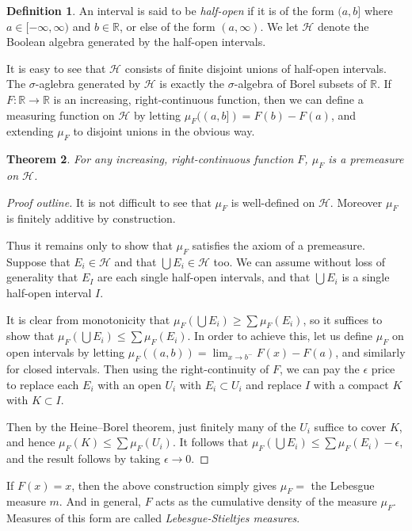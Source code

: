 \documentclass[11pt,oneside]{amsbook}
\newcommand{\RR}{{\mathbb R}}
\theoremstyle{definition}
\theoremstyle{plain}
\newtheorem{thm}{Theorem}[section]
\theoremstyle{definition}
\newtheorem{defn}[thm]{Definition}
\theoremstyle{remark}
\numberwithin{equation}{section}
\numberwithin{figure}{section}
\begin{document}
\begin{defn}
  An interval is said to be \emph{half-open} if it is of the form $(a,b]$ where $a\in[-\infty,\infty)$ and $b\in\RR$, or else of the form $(a,\infty)$. We let $\mathcal H$ denote the Boolean algebra generated by the half-open intervals.
\end{defn}

It is easy to see that $\mathcal H$ consists of finite disjoint unions of half-open intervals. The $\sigma$-aglebra generated by $\mathcal H$ is exactly the $\sigma$-algebra of Borel subsets of $\RR$. If $F\colon\RR\to\RR$ is an increasing, right-continuous function, then we can define a measuring function on $\mathcal H$ by letting $\mu_F((a,b])=F(b)-F(a)$, and extending $\mu_F$ to disjoint unions in the obvious way.

\begin{thm}
  For any increasing, right-continuous function $F$, $\mu_F$ is a premeasure on $\mathcal H$.
\end{thm}

\begin{proof}[Proof outline]
  It is not difficult to see that $\mu_F$ is well-defined on $\mathcal H$. Moreover $\mu_F$ is finitely additive by construction.

  Thus it remains only to show that $\mu_F$ satisfies the axiom of a premeasure. Suppose that $E_i\in\mathcal H$ and that $\bigcup E_i\in\mathcal H$ too. We can assume without loss of generality that $E_I$ are each single half-open intervals, and that $\bigcup E_i$ is a single half-open interval $I$.

  It is clear from monotonicity that $\mu_F(\bigcup E_i)\geq\sum\mu_F(E_i)$, so it suffices to show that $\mu_F(\bigcup E_i)\leq\sum\mu_F(E_i)$. In order to achieve this, let us define $\mu_F$ on open intervals by letting $\mu_F((a,b))=\lim_{x\to b^-}F(x)-F(a)$, and similarly for closed intervals. Then using the right-continuity of $F$, we can pay the $\epsilon$ price to replace each $E_i$ with an open $U_i$ with $E_i\subset U_i$ and replace $I$ with a compact $K$ with $K\subset I$.

  Then by the Heine--Borel theorem, just finitely many of the $U_i$ suffice to cover $K$, and hence $\mu_F(K)\leq\sum\mu_F(U_i)$. It follows that $\mu_F(\bigcup E_i)\leq\sum\mu_F(E_i)-\epsilon$, and the result follows by taking $\epsilon\to0$.
\end{proof}

If $F(x)=x$, then the above construction simply gives $\mu_F=$ the Lebesgue measure $m$. And in general, $F$ acts as the cumulative density of the measure $\mu_F$. Measures of this form are called \emph{Lebesgue-Stieltjes measures}.
\end{document}

